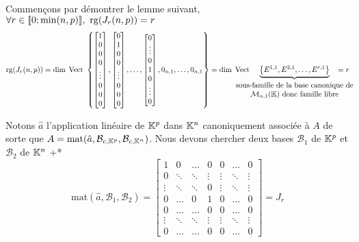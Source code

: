 \documentclass{article}
\begin{document}
\begin{question_kholle}
	Commençons par démontrer le lemme suivant, $\forall r \in \lient 0; \min(n,p) \rient, \ \mathrm{rg}(J_r(n, p)) = r$
	\begin{equation*}
		\mathrm{rg}(J_r(n, p))
		= \dim \; \Vect \left\{
			\begin{bmatrix}
				1 \\ 0 \\ 0 \\ 0 \\ \vdots \\ 0 \\ 0 \\ 0
			\end{bmatrix} ,
			\begin{bmatrix}
				0 \\ 1 \\ 0 \\ 0 \\ \vdots \\ 0 \\ 0 \\ 0
			\end{bmatrix} ,
			\ldots ,
			\begin{bmatrix}
			0 \\ \vdots \\ 0 \\ 1 \\ 0 \\ \vdots \\ 0
			\end{bmatrix} ,
			0_{n, 1},
			\ldots,
			0_{n, 1}
		\right\}
		= \dim \; \Vect \hspace{-10mm} \underbrace{ \left\{
			E^{1,1},
			E^{2,1},
			\ldots,
			E^{r,1}
		\right\} }
		_{ \begin{array}{c}
			\text{sous-famille de la base canonique de} \\
			\mathcal{M}_{n,1}(\K) \text{ donc famille libre}
		\end{array} } \hspace{-10mm}
		= r
	\end{equation*}
	
	\bigbreak \bigbreak
	Notons  $\hat{a}$ l'application linéaire de $\mathbb K^p$ dans $\mathbb K^n$ canoniquement associée à $A$ de sorte que $A = \mathrm{mat}(\hat{a}, \mathcal{B}_{c, \mathbb K^p}, \mathcal{B}_{c, \mathbb K^n})$. Nous devons chercher deux bases $\mathcal{B}_1$ de $\mathbb K^p$ et $\mathcal{B}_2$ de $\mathbb K^n$ \tq+*
	$$
		\mathrm{mat}(\hat{a}, \mathcal{B}_1, \mathcal{B}_2)
		= \left[ \begin{array}{cccc|ccc}
			1 & 0 & \ldots & 0 & 0 & \ldots & 0 \\
			0 & \ddots & \ddots & \vdots & \vdots & \ddots & \vdots \\
			\vdots & \ddots & \ddots & 0 & \vdots & \ddots & \vdots \\
			0 & \ldots & 0 & 1 & 0 & \ldots & 0 \\
			\hline
			0 & \ldots & \ldots & 0 & 0 & \ldots & 0 \\
			\vdots & \ddots & \ddots & \vdots & \vdots & \ddots & \vdots \\
			0 & \ldots & \ldots & 0 & 0 & \ldots & 0
		\end{array} \right]
		= J_r
	$$
	

\end{question_kholle}
\end{document}
